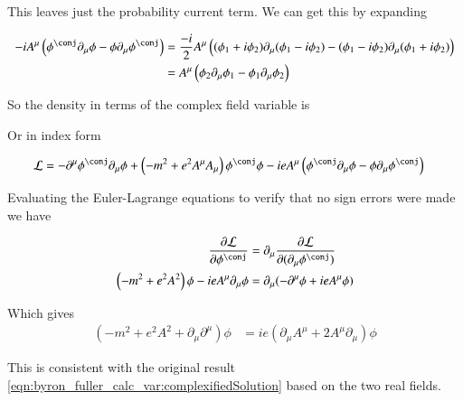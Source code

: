 This leaves just the probability current term.  We can get this by expanding

\begin{align*}
- i A^\mu \left( \phi^\conj \partial_\mu \phi - \phi \partial_\mu \phi^\conj \right)
&=
\frac{-i}{2} A^\mu \left( (\phi_1 + i \phi_2) \partial_\mu (\phi_1 - i \phi_2) - (\phi_1 - i \phi_2) \partial_\mu (\phi_1 + i \phi_2) \right) \\
&=
A^\mu \left( \phi_2 \partial_\mu \phi_1 - \phi_1 \partial_\mu \phi_2 \right)
\end{align*}


So the density in terms of the complex field variable is 

%
Or in index form

\begin{align}\label{eqn:byron_fuller_calc_var:densityComplex}
\LL 
&=
-\partial^\mu \phi^\conj \partial_\mu \phi
+ \left( -m^2 + e^2 A^\mu A_\mu \right) \phi^\conj \phi
- i e A^\mu \left( \phi^\conj \partial_\mu \phi - \phi \partial_\mu \phi^\conj \right)
\end{align}

Evaluating the Euler-Lagrange equations to verify that no sign errors were made we have

\begin{align*}
\PD{\phi^\conj}{\LL}
&=
\partial_\mu \PD{(\partial_\mu \phi^\conj)}{\LL} \\
\left( -m^2 + e^2 A^2 \right) \phi 
- i e A^\mu \partial_\mu \phi
&=
\partial_\mu (-\partial^\mu \phi + i e A^\mu \phi) \\
\end{align*}

Which gives
\begin{align}
\left( -m^2 + e^2 A^2 + \partial_\mu \partial^\mu \right) \phi &= i e (\partial_\mu A^\mu + 2 A^\mu \partial_\mu) \phi
\end{align}

This is consistent with the original result \ref{eqn:byron_fuller_calc_var:complexifiedSolution} based on the two real fields.

